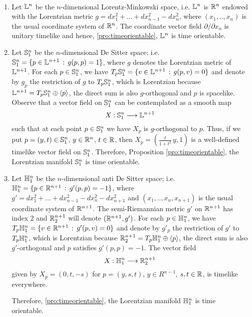 \begin{example}
	~		
	\begin{enumerate}
		\item Let $\L^n$ be the $n$-dimensional Lorentz-Minkowski space, i.e. $\L^n$ is $\R^n$ endowed with the Lorentzian metric $g=dx_1^2+...+dx_{n-1}^2-dx_n^2$, where $(x_1,..,x_n)$ is the usual coordinate system of $\R^n$. The coordinate vector field $\partial/\partial x_n$ is unitary timelike and hence, \autoref{pro:timeorientable}, $\L ^n$ is time orientable.
		\item Let $\S_1^n$ be the $n$-dimensional De Sitter space; i.e. $\S_1^n =\{p \in \L^{n+1} \, :\, g(p,p)=1 \}$, where $g$ denotes the Lorentzian metric of $\L^{n+1}$. For each $p \in \S_1^n$, we have $T_p\S_1^n=\{v \in \L^{n+1} \, : \, g(p,v)=0\}$
		and denote by $g_p$ the restriction of $g$ to $T_p\S_1^n$, which is Lorentzian because $\L^{n+1}=T_p\S_1^n \oplus \langle p \rangle$, the direct sum is also $g$-orthogonal and $p$ is spacelike. Observe that a vector field on $\S_1^n$ can be contemplated as a smooth map
		\[
		X : \S_1^n \longrightarrow \L^{n+1}
		\]
		such that at each point $p \in \S_1^n$ we have $X_p$ is $g$-orthogonal to $p$. Thus, if we put $p=(y,t)\in \S_1^n$, $y \in \R^n$, $t \in \R$, then $X_p=(\frac{t}{1+t^2}\,y,1)$ is a well-defined timelike vector field on $\S_1^n$. Therefore, Proposition \autoref{pro:timeorientable}, the Lorentzian manifold $\S_1^n$ is time orientable.
		\item Let $\H_1^n$ be the $n$-dimensional anti De Sitter space; i.e. $\H_1^n =\{p \in \R^{n+1} \, :\, g'(p,p)=-1 \}$, where $g'=dx_1^2+...+dx_{n-1}^2-dx_n^2-dx_{n+1}^2$ and $(x_1,..,x_n,x_{n+1})$ is the usual coordinate system of $\R^{n+1}$. The semi-Riemannian metric $g'$ on $\R^{n+1}$ has index 2 and $\R^{n+1}_2$ will denote $(\R^{n+1},g')$. For each $p \in \H_1^n$, we have $T_p\H_1^n=\{v \in \R^{n+1} \, : \, g'(p,v)=0\}$ and denote by $g'_p$ the restriction of $g'$ to $T_p\H_1^n$, which is Lorentzian because $\R^{n+1}_2=T_p\H_1^n \oplus \langle p \rangle$, the direct sum is also $g'$-orthogonal and $p$ satisfies $g'(p,p)=-1$. The vector field
		\[
		X : \H_1^n \longrightarrow \R^{n+1}_2
		\]
		given by $X_p=(0,t,-s)$ for $p=(y,s,t)$, $y \in R^{n-1}$, $s,t\in \R$, is timelike everywhere.
		
		Therefore, \autoref{pro:timeorientable}, the Lorentzian manifold $\H_1^n$ is time orientable.
	\end{enumerate}
\end{example}


